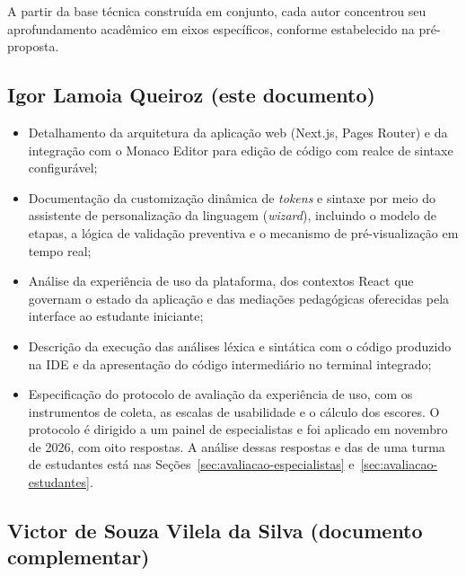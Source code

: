 A partir da base técnica construída em conjunto, cada autor concentrou seu aprofundamento acadêmico em eixos específicos, conforme estabelecido na pré-proposta.

\subsection{Igor Lamoia Queiroz (este documento)}

\begin{itemize}
    \item Detalhamento da arquitetura da aplicação web (Next.js, Pages Router) e da integração com o Monaco Editor para edição de código com realce de sintaxe configurável;
    \item Documentação da customização dinâmica de \textit{tokens} e sintaxe por meio do assistente de personalização da linguagem (\textit{wizard}), incluindo o modelo de etapas, a lógica de validação preventiva e o mecanismo de pré-visualização em tempo real;
    \item Análise da experiência de uso da plataforma, dos contextos React que governam o estado da aplicação e das mediações pedagógicas oferecidas pela interface ao estudante iniciante;
    \item Descrição da execução das análises léxica e sintática com o código produzido na IDE e da apresentação do código intermediário no terminal integrado;
    \item Especificação do protocolo de avaliação da experiência de uso, com os instrumentos de coleta, as escalas de usabilidade e o cálculo dos escores. O protocolo é dirigido a um painel de especialistas e foi aplicado em novembro de 2026, com oito respostas. A análise dessas respostas e das de uma turma de estudantes está nas Seções~\ref{sec:avaliacao-especialistas} e~\ref{sec:avaliacao-estudantes}.
\end{itemize}

\subsection{Victor de Souza Vilela da Silva (documento complementar)}

